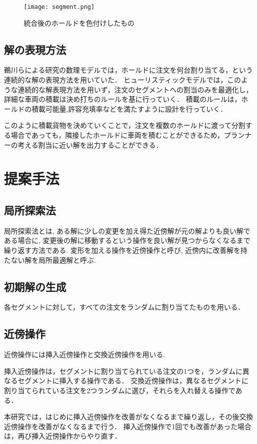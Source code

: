 \documentclass[a4j,11pt,twocolumn]{jsarticle}
\begin{document}
\begin{figure}[htbp]
 \centering
 \texttt{[image: segment.png]}
 \caption{統合後のホールドを色付けしたもの}
 \label{fig1}
\end{figure}

\subsection{解の表現方法}
鵜川らによる研究の数理モデル\cite{ukawa}では，ホールドに注文を何台割り当てる，という連続的な解の表現方法を用いていた．
ヒューリスティックモデルでは，このような連続的な解表現方法を用いず，注文のセグメントへの割当のみを最適化し，詳細な車両の積載は決め打ちのルールを基に行っていく．
積載のルールは，ホールドの積載可能量,許容充填率などを満たすように設計を行っていく．

このように積載貨物を決めていくことで，注文を複数のホールドに渡って分割する場合であっても，隣接したホールドに車両を積むことができるため，プランナーの考える割当に近い解を出力することができる．

\section{提案手法}
\subsection{局所探索法}
局所探索法とは, ある解に少しの変更を加え得た近傍解が元の解よりも良い解である場合に, 変更後の解に移動するという操作を良い解が見つからなくなるまで繰り返す方法である.
変形を加える操作を近傍操作と呼び, 近傍内に改善解を持たない解を局所最適解と呼ぶ.

\subsection{初期解の生成}
\label{初期解}
各セグメントに対して，すべての注文をランダムに割り当てたものを用いる．

\subsection{近傍操作}
近傍操作には挿入近傍操作と交換近傍操作を用いる.

挿入近傍操作は，セグメントに割り当てられている注文の1つを，ランダムに異なるセグメントに挿入する操作である．
交換近傍操作は，異なるセグメントに割り当てられている注文を2つランダムに選び，それらを入れ替える操作である．

本研究では，はじめに挿入近傍操作を改善がなくなるまで繰り返し，その後交換近傍操作を改善がなくなるまで行う．
挿入近傍操作で1回でも改善があった場合は，再び挿入近傍操作からやり直す．
\end{document}
